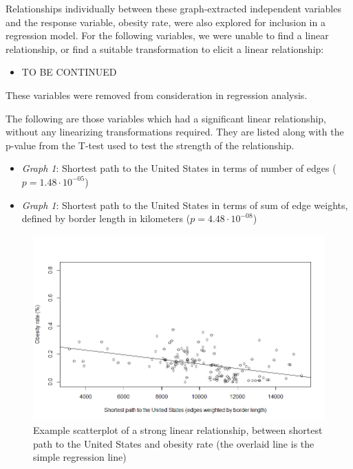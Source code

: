 \documentclass[oneside,12pt]{report}
\begin{document}

Relationships individually between these graph-extracted independent variables and the response variable, obesity rate, were also explored for inclusion in a regression model. For the following variables, we were unable to find a linear relationship, or find a suitable transformation to elicit a linear relationship:

\begin{itemize}
\item TO BE CONTINUED
\end{itemize}

These variables were removed from consideration in regression analysis.

The following are those variables which had a significant linear relationship, without any linearizing transformations required. They are listed along with the p-value from the T-test used to test the strength of the relationship.

\begin{itemize}
\item \emph{Graph 1}: Shortest path to the United States in terms of number of edges (\begin{math}p=1.48\cdot10^{-05}\end{math})
\item \emph{Graph 1}: Shortest path to the United States in terms of sum of edge weights, defined by border length in kilometers (\begin{math}p=4.48\cdot10^{-08}\end{math})
\end{itemize}

\begin{figure}
\centering
\label{fig:shortpath-obesity-scatter}
\includegraphics[width=\textwidth]{borderdegrees_wtd-obrate-scatter.png}
\caption[Scatterplot of a linear relationship with a graph-theoretic variable]{Example scatterplot of a strong linear relationship, between shortest path to the United States and obesity rate (the overlaid line is the simple regression line)}
\end{figure}
\end{document}
